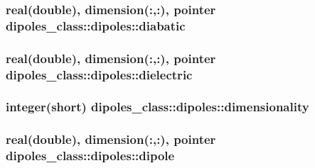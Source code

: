 \hypertarget{structdipoles__class_1_1dipoles_acb589f5c8c60337abc5da4b268ccd0e8}{
\subsubsection[{diabatic}]{\setlength{\rightskip}{0pt plus 5cm}real(double), dimension(\+:,\+:), pointer dipoles\+\_\+class\+::dipoles\+::diabatic\hspace{0.3cm}{\ttfamily [private]}}}\label{structdipoles__class_1_1dipoles_acb589f5c8c60337abc5da4b268ccd0e8}
\hypertarget{structdipoles__class_1_1dipoles_a669f75c4c95efa1ea721ba8aa7f785d3}{
\subsubsection[{dielectric}]{\setlength{\rightskip}{0pt plus 5cm}real(double), dimension(\+:,\+:), pointer dipoles\+\_\+class\+::dipoles\+::dielectric\hspace{0.3cm}{\ttfamily [private]}}}\label{structdipoles__class_1_1dipoles_a669f75c4c95efa1ea721ba8aa7f785d3}
\hypertarget{structdipoles__class_1_1dipoles_ae809ff43be02c6f93cd5a6010368a246}{
\subsubsection[{dimensionality}]{\setlength{\rightskip}{0pt plus 5cm}integer(short) dipoles\+\_\+class\+::dipoles\+::dimensionality\hspace{0.3cm}{\ttfamily [private]}}}\label{structdipoles__class_1_1dipoles_ae809ff43be02c6f93cd5a6010368a246}
\hypertarget{structdipoles__class_1_1dipoles_a6786ac3377ec10046d5a7bacf0b14da1}{
\subsubsection[{dipole}]{\setlength{\rightskip}{0pt plus 5cm}real(double), dimension(\+:,\+:), pointer dipoles\+\_\+class\+::dipoles\+::dipole\hspace{0.3cm}{\ttfamily [private]}}}\label{structdipoles__class_1_1dipoles_a6786ac3377ec10046d5a7bacf0b14da1}
